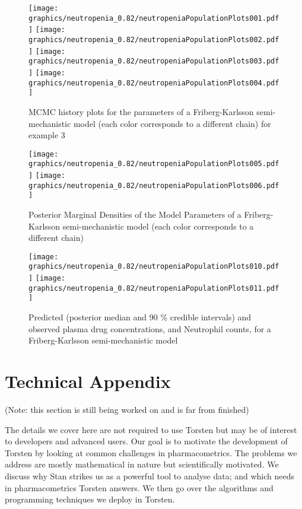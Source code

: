 \documentclass[11pt]{amsart}
\let\oldsection\section
\renewcommand\section{\clearpage\oldsection}
\begin{document}
\begin{figure}[htbp]
\texttt{[image: graphics/neutropenia\_0.82/neutropeniaPopulationPlots001.pdf]}
\texttt{[image: graphics/neutropenia\_0.82/neutropeniaPopulationPlots002.pdf]}
\texttt{[image: graphics/neutropenia\_0.82/neutropeniaPopulationPlots003.pdf]}
\texttt{[image: graphics/neutropenia\_0.82/neutropeniaPopulationPlots004.pdf]}
\caption{{MCMC history plots for the parameters of a Friberg-Karlsson semi-mechanistic model (each color corresponds to a different chain) for example 3}}
\label{FKMCMC}
\end{figure}

\begin{figure}[htbp]
\texttt{[image: graphics/neutropenia\_0.82/neutropeniaPopulationPlots005.pdf]}
\texttt{[image: graphics/neutropenia\_0.82/neutropeniaPopulationPlots006.pdf]}
\caption{{Posterior Marginal Densities of the Model Parameters of a Friberg-Karlsson semi-mechanistic model (each color corresponds to a different chain)}}
\label{FKDens}
\end{figure}

\begin{figure}[htbp]
\texttt{[image: graphics/neutropenia\_0.82/neutropeniaPopulationPlots010.pdf]}
\texttt{[image: graphics/neutropenia\_0.82/neutropeniaPopulationPlots011.pdf]}
\caption{{Predicted (posterior median and 90 \% credible intervals) and observed plasma drug concentrations, and Neutrophil counts, for a Friberg-Karlsson semi-mechanistic model}}
\label{FKPredictions}
\end{figure}
 

\section{Technical Appendix}

(Note: this section is still being worked on and is far from finished)

\iffalse
The details we cover here are not required to use Torsten but may be of interest to developers and advanced users. Our goal is to motivate the development of Torsten by looking at common challenges in pharmacometrics. The problems we address are mostly mathematical in nature but scientifically motivated. We discuss why Stan strikes us as a powerful tool to analyse data; and which needs in pharmacometrics Torsten answers. We then go over the algorithms and programming techniques we deploy in Torsten. 
\end{document}
